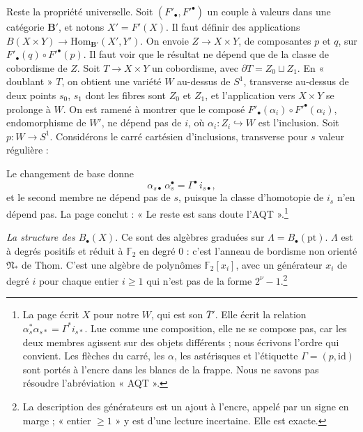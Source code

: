 \documentclass[11pt,a4paper]{article}
\begin{document}
Reste la propriété universelle. Soit $(F'_\bullet, F'^\bullet)$ un couple à
valeurs dans une catégorie $\mathbf{B}'$, et notons $X' = F'(X)$. Il faut
définir des applications $B(X \times Y) \to \mathrm{Hom}_{\mathbf{B}'}(X',
Y')$. On envoie $Z \to X \times Y$, de composantes $p$ et $q$, sur
$F'_\bullet(q) \circ F'^\bullet(p)$. Il faut voir que le résultat ne dépend que
de la classe de cobordisme de $Z$. Soit $T \to X \times Y$ un cobordisme,
avec $\partial T = Z_0 \sqcup Z_1$. En « doublant » $T$, on obtient une variété
$W$ au-dessus de $S^{1}$, transverse au-dessus de deux points $s_0$, $s_1$ dont
les fibres sont $Z_0$ et $Z_1$, et l'application vers $X \times Y$ se
prolonge à $W$. On est ramené à montrer que le composé $F'_\bullet(\alpha_i)
\circ F'^\bullet(\alpha_i)$, endomorphisme de $W'$, ne dépend pas de $i$, où
$\alpha_i : Z_i \hookrightarrow W$ est l'inclusion. Soit $p : W \to S^{1}$.
Considérons le carré cartésien d'inclusions, transverse pour $s$ valeur
régulière :


Le changement de base donne
\[
\alpha_{s\bullet}\,\alpha_s^{\bullet} = \Gamma^{\bullet}\, i_{s\bullet},
\]
et le second membre ne dépend pas de $s$, puisque la classe d'homotopie de $i_s$
n'en dépend pas. La page conclut : « Le reste est sans doute
l'AQT ».\footnote{La page écrit $X$ pour notre $W$, qui est son $\overline{T}'$.
Elle écrit la relation $\alpha_s^{*}\alpha_{s*} = \Gamma^{*} i_{s*}$. Lue comme
une composition, elle ne se compose pas, car les deux membres agissent sur des
objets différents ; nous écrivons l'ordre qui convient. Les flèches du carré,
les $\alpha$, les astérisques et l'étiquette $\Gamma = (p, \mathrm{id})$ sont
portés à l'encre dans les blancs de la frappe. Nous ne savons pas résoudre
l'abréviation « AQT ».}

\emph{La structure des $B_\bullet(X)$.} Ce sont des algèbres graduées sur
$\Lambda = B_\bullet(\mathrm{pt})$. $\Lambda$ est à degrés positifs et réduit à
$\mathbb{F}_2$ en degré 0 : c'est l'anneau de bordisme non orienté
$\mathfrak{N}_*$ de Thom. C'est une algèbre de polynômes
$\mathbb{F}_2[x_i]$, avec un générateur $x_i$ de degré $i$ pour chaque entier
$i \geq 1$ qui n'est pas de la forme $2^{\nu} - 1$.\footnote{La description des
générateurs est un ajout à l'encre, appelé par un signe en marge ; « entier
$\geq 1$ » y est d'une lecture incertaine. Elle est exacte.}
\end{document}
